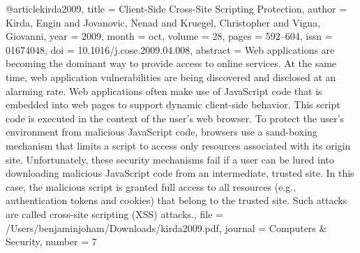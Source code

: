 @article{kirda2009,
  title = {Client-Side Cross-Site Scripting Protection},
  author = {Kirda, Engin and Jovanovic, Nenad and Kruegel, Christopher and Vigna, Giovanni},
  year = {2009},
  month = oct,
  volume = {28},
  pages = {592--604},
  issn = {01674048},
  doi = {10.1016/j.cose.2009.04.008},
  abstract = {Web applications are becoming the dominant way to provide access to online services. At the same time, web application vulnerabilities are being discovered and disclosed at an alarming rate. Web applications often make use of JavaScript code that is embedded into web pages to support dynamic client-side behavior. This script code is executed in the context of the user's web browser. To protect the user's environment from malicious JavaScript code, browsers use a sand-boxing mechanism that limits a script to access only resources associated with its origin site. Unfortunately, these security mechanisms fail if a user can be lured into downloading malicious JavaScript code from an intermediate, trusted site. In this case, the malicious script is granted full access to all resources (e.g., authentication tokens and cookies) that belong to the trusted site. Such attacks are called cross-site scripting (XSS) attacks.},
  file = {/Users/benjaminjoham/Downloads/kirda2009.pdf},
  journal = {Computers \& Security},
  number = {7}
}

